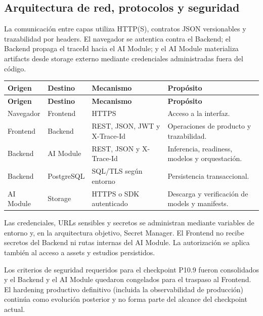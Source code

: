 \subsection{Arquitectura de red, protocolos y seguridad}

La comunicación entre capas utiliza HTTP(S), contratos JSON versionables y trazabilidad por headers. El navegador se autentica contra el Backend; el Backend propaga el traceId hacia el AI Module; y el AI Module materializa artifacts desde storage externo mediante credenciales administradas fuera del código.

{\footnotesize
\setlength{\LTleft}{0pt}
\setlength{\LTright}{0pt}
\setlength{\tabcolsep}{2pt}
\renewcommand{\arraystretch}{1.18}
\label{tab:arch-red-seguridad}
\begin{longtable}{>{\raggedright\arraybackslash}p{} >{\raggedright\arraybackslash}p{} >{\raggedright\arraybackslash}p{} >{\raggedright\arraybackslash}p{}}
\hline
\textbf{Origen} & \textbf{Destino} & \textbf{Mecanismo} & \textbf{Propósito} \\
\hline
\endfirsthead
\hline
\textbf{Origen} & \textbf{Destino} & \textbf{Mecanismo} & \textbf{Propósito} \\
\hline
\endhead
\hline
\endfoot
Navegador & Frontend & HTTPS & Acceso a la interfaz. \\
Frontend & Backend & REST, JSON, JWT y X-Trace-Id & Operaciones de producto y trazabilidad. \\
Backend & AI Module & REST, JSON y X-Trace-Id & Inferencia, readiness, modelos y orquestación. \\
Backend & PostgreSQL & SQL/TLS según entorno & Persistencia transaccional. \\
AI Module & Storage & HTTPS o SDK autenticado & Descarga y verificación de models y manifests. \\
\hline
\end{longtable}
}

Las credenciales, URLs sensibles y secretos se administran mediante variables de entorno y, en la arquitectura objetivo, Secret Manager. El Frontend no recibe secretos del Backend ni rutas internas del AI Module. La autorización se aplica también al acceso a assets y estudios persistidos.

Los criterios de seguridad requeridos para el checkpoint P10.9 fueron consolidados y el Backend y el AI Module quedaron congelados para el traspaso al Frontend. El hardening productivo definitivo (incluida la observabilidad de producción) continúa como evolución posterior y no forma parte del alcance del checkpoint actual.

